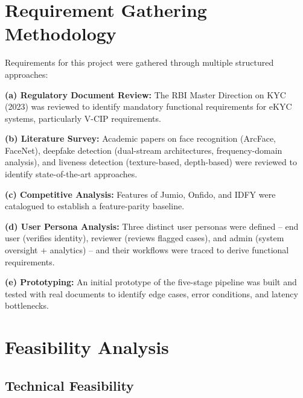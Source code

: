 \documentclass[12pt,a4paper]{report}
\begin{document}
\section{Requirement Gathering Methodology}

Requirements for this project were gathered through multiple structured approaches:

\textbf{(a) Regulatory Document Review:} The RBI Master Direction on KYC (2023) was reviewed to identify mandatory functional requirements for eKYC systems, particularly V-CIP requirements.

\textbf{(b) Literature Survey:} Academic papers on face recognition (ArcFace, FaceNet), deepfake detection (dual-stream architectures, frequency-domain analysis), and liveness detection (texture-based, depth-based) were reviewed to identify state-of-the-art approaches.

\textbf{(c) Competitive Analysis:} Features of Jumio, Onfido, and IDFY were catalogued to establish a feature-parity baseline.

\textbf{(d) User Persona Analysis:} Three distinct user personas were defined -- end user (verifies identity), reviewer (reviews flagged cases), and admin (system oversight + analytics) -- and their workflows were traced to derive functional requirements.

\textbf{(e) Prototyping:} An initial prototype of the five-stage pipeline was built and tested with real documents to identify edge cases, error conditions, and latency bottlenecks.

\section{Feasibility Analysis}

\subsection{Technical Feasibility}
\end{document}

